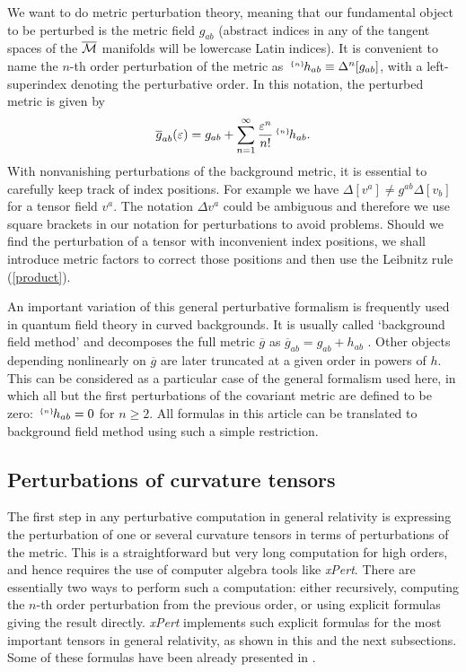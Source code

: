 \documentclass[aps,prd,showpacs]{revtex4}
\newcommand{\xPert}{{\em \lowercase{x}P\lowercase{ert}}}
\newcommand{\pert}[2]{{}^{\mbox{\,\tiny $\{#1\}\!$}}{#2}}
\newcommand{\h}[1]{{}^{\mbox{\,\tiny $\{#1\}\!$}}h}
\begin{document}
We want to do metric perturbation theory, meaning that our fundamental
object to be perturbed is the metric field $g_{ab}$ (abstract indices
in any of the tangent spaces of the $\overline{\cal M}$ manifolds will be
lowercase Latin indices). It is convenient to
name the $n$-th order perturbation of the metric as
$\pert{n}{h}_{ab}\equiv \Delta^n[g_{ab}]$, with a left-superindex
denoting the perturbative order. In this notation, the perturbed metric
is given by
\begin{equation} \label{metricexpansion}
\overline g_{ab}(\varepsilon)=g_{ab} + \sum_{n=1}^\infty\frac{\varepsilon^n}{n!} \pert{n}{h}_{ab}.
\end{equation}
With nonvanishing perturbations of the background metric, it is essential
to carefully keep track of index positions. For example we have
$\Delta[v^a]\neq g^{ab}\Delta[v_b]$ for a tensor field $v^a$. The notation
$\Delta v^a$ could be ambiguous and therefore we use square brackets in
our notation for perturbations to avoid problems. Should we find the
perturbation of a tensor with inconvenient index positions, we shall
introduce metric factors to correct those positions and then use the
Leibnitz rule (\ref{product}).

An important variation of this general perturbative formalism
is frequently used in quantum field theory in curved backgrounds.
It is usually called `background field method' and decomposes the
full metric $\overline{g}$ as $\overline{g}_{ab} = g_{ab} + h_{ab}$ \cite{BFT}.
Other objects depending nonlinearly on $\overline{g}$ are later truncated at
a given order in powers of $h$. This can be considered as a particular
case of the general formalism used here, in which all but the first
perturbations of the covariant metric are defined to be zero:
$\h{n}_{ab}=0$ for $n\geq 2$. All formulas in this article can be
translated to background field method using such a simple restriction.

\subsection{Perturbations of curvature tensors}

The first step in any perturbative computation in general relativity is
expressing the perturbation of one or several curvature tensors in terms
of perturbations of the metric. This is a straightforward but very long
computation for high orders, and hence requires the use of computer
algebra tools like \xPert. There are essentially two ways to
perform such a computation: either recursively, computing the $n$-th
order perturbation from the previous order, or using explicit
formulas giving the result directly. \xPert\/ implements such
explicit formulas for the most important tensors in general relativity,
as shown in this and the next subsections. Some of these formulas have
been already presented in \cite{BMM06}.
\end{document}
